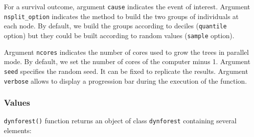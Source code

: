For a survival outcome, argument \texttt{cause} indicates the event of interest. Argument \texttt{nsplit\_option} indicates the method to build the two groups of individuals at each node. By default, we build the groups according to deciles (\texttt{quantile} option) but they could be built according to random values (\texttt{sample} option).

Argument \texttt{ncores} indicates the number of cores used to grow the trees in parallel mode. By default, we set the number of cores of the computer minus 1. Argument \texttt{seed} specifies the random seed. It can be fixed to replicate the results. Argument \texttt{verbose} allows to display a progression bar during the execution of the function.

\subsubsection{Values}\label{values}

\texttt{dynforest()} function returns an object of class \texttt{dynforest} containing several elements:

